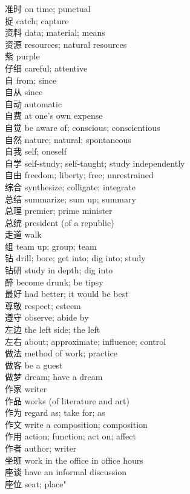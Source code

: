 准时 \quad on time; punctual\\
捉 \quad catch; capture\\
资料 \quad data; material; means\\
资源 \quad resources; natural resources\\
紫 \quad purple\\
仔细 \quad careful; attentive\\
自 \quad from; since\\
自从 \quad since\\
自动 \quad automatic\\
自费 \quad at one's own expense\\
自觉 \quad be aware of; conscious; conscientious\\
自然 \quad nature; natural; spontaneous\\
自我 \quad self; oneself\\
自学 \quad self-study; self-taught; study independently\\
自由 \quad freedom; liberty; free; unrestrained\\
综合 \quad synthesize; colligate; integrate\\
总结 \quad summarize; sum up; summary\\
总理 \quad premier; prime minister\\
总统 \quad president (of a republic)\\
走道 \quad walk\\
组 \quad team up; group; team\\
钻 \quad drill; bore; get into; dig into; study\\
钻研 \quad study in depth; dig into\\
醉 \quad become drunk; be tipsy\\
最好 \quad had better; it would be best\\
尊敬 \quad respect; esteem\\
遵守 \quad observe; abide by\\
左边 \quad the left side; the left\\
左右 \quad about; approximate; influence; control\\
做法 \quad method of work; practice\\
做客 \quad be a guest\\
做梦 \quad dream; have a dream\\
作家 \quad writer\\
作品 \quad works (of literature and art)\\
作为 \quad regard as; take for; as\\
作文 \quad write a composition; composition\\
作用 \quad action; function; act on; affect\\
作者 \quad author; writer\\
坐班 \quad work in the office in office hours\\
座谈 \quad have an informal discussion\\
座位 \quad seat; place"\\
